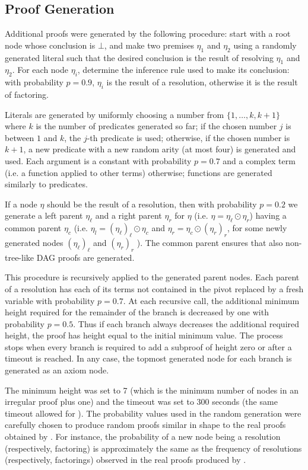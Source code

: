 \subsection{Proof Generation}
Additional proofs were generated by the following procedure: start with a root node whose conclusion is $\bot$, and make two premises $\eta_1$ and $\eta_2$ using a randomly generated literal such that the desired conclusion is the result of resolving $\eta_1$ and $\eta_2$. 
For each node $\eta_i$, determine the inference rule used to make its conclusion: with probability $p=0.9$, $\eta_i$ is the result of a resolution, otherwise it is the result of  factoring. 

Literals are generated by uniformly choosing a number from $\{1,\dots,k,k+1\}$ where $k$ is the number of predicates generated so far; if the chosen number $j$ is between $1$ and $k$, the $j$-th predicate is used; otherwise, if the chosen number is $k+1$, a new predicate with a new random arity (at most four) is generated and used. 
Each argument is a constant with probability $p=0.7$ and a complex term (i.e. a function applied to other terms) otherwise; functions are generated similarly to predicates. 

If a node $\eta$ should be the result of a resolution, then with probability $p=0.2$ we generate a left parent $\eta_\ell$ and a right parent $\eta_r$ for $\eta$ (i.e. $\eta = \eta_\ell \odot \eta_r$) having a common parent $\eta_c$ (i.e. $\eta_l = (\eta_\ell)_\ell \odot \eta_c$ and $\eta_r = \eta_c \odot (\eta_r)_r$, for some newly generated nodes $(\eta_\ell)_\ell$ and $(\eta_r)_r$ ). 
The common parent ensures that also non-tree-like DAG proofs are generated. 

This procedure is recursively applied to the generated parent nodes. 
Each parent of a resolution has each of its terms not contained in the pivot replaced by a fresh variable with probability $p=0.7$.
At each recursive call, the additional minimum height required for the remainder of the branch is decreased by one with probability $p=0.5$. 
Thus if each branch always decreases the additional required height, the proof has height equal to the initial minimum value. 
The process stops when every branch is required to add a subproof of height zero or after a timeout is reached. 
In any case, the topmost generated node for each branch is generated as an axiom node. 

The minimum height was set to 7 (which is the minimum number of nodes in an irregular proof plus one) and the timeout was set to 300 seconds (the same timeout allowed for {\SPASS}). 
The probability values used in the random generation were carefully chosen to produce random proofs similar in shape to the real proofs obtained by {\SPASS}. 
For instance, the probability of a new node being a resolution (respectively, factoring) is approximately the same as the frequency of resolutions (respectively, factorings) observed in the real proofs produced by {\SPASS}.


